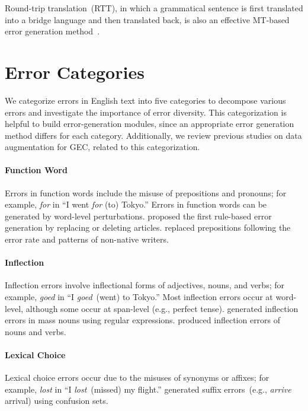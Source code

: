 \documentclass[11pt]{article}
\begin{document}
Round-trip translation~(RTT), in which a grammatical sentence is first translated into a bridge language and then translated back,
is also an effective MT-based error generation method~\citep{lichtarge-etal-2019-corpora,lichtarge-etal-2020-data}.

\section{Error Categories}

We categorize errors in English text into five categories
to decompose various errors
and investigate the importance of error diversity.
This categorization is helpful to build error-generation modules,
since an appropriate error generation method differs for each category.
Additionally, we review previous studies on data augmentation for GEC, related to this categorization.

\paragraph{Function Word}
Errors in function words include the misuse of prepositions and pronouns; for example, \textit{for} in ``I went \textit{for} (\textrightarrow to) Tokyo.''
Errors in function words can be generated by word-level perturbations.
\citet{izumi-etal-2003-automatic} proposed the first rule-based error generation by replacing or deleting articles.
\citet{rozovskaya-roth-2010-generating} replaced prepositions following the error rate and patterns of non-native writers.

\paragraph{Inflection}
Inflection errors involve inflectional forms of adjectives, nouns, and verbs;
for example, \textit{goed} in ``I \textit{goed}~(\textrightarrow went) to Tokyo.''
Most inflection errors occur at word-level, although some occur at span-level (e.g., perfect tense).
\citet{brockett-etal-2006-correcting} generated inflection errors in mass nouns using regular expressions.
\citet{choe-etal-2019-neural} produced inflection errors of nouns and verbs.

\paragraph{Lexical Choice}
Lexical choice errors occur due to the misuses of synonyms or affixes;
for example, \textit{lost} in ``I \textit{lost}~(\textrightarrow missed) my flight.''
\citet{xu-etal-2019-erroneous} generated suffix errors~(e.g., \textit{arrive} \textrightarrow arrival) using confusion sets.
\end{document}
